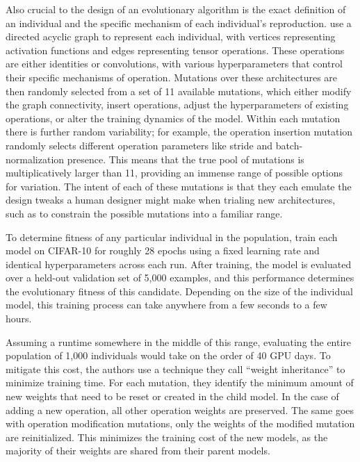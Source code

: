 Also crucial to the design of an evolutionary algorithm is the exact definition of an individual and the specific mechanism
of each individual's reproduction. \citeauthor{real2017} use a directed acyclic graph to represent each individual, with vertices
representing activation functions and edges representing tensor operations. These operations are either identities or
convolutions, with various hyperparameters that control their specific mechanisms of operation. Mutations over these
architectures are then randomly selected from a set of 11 available mutations, which either modify the graph connectivity,
insert operations, adjust the hyperparameters of existing operations, or alter the training dynamics of the model. Within
each mutation there is further random variability; for example, the operation insertion mutation randomly selects
different operation parameters like stride and batch-normalization presence. This means that the true pool of mutations
is multiplicatively larger than 11, providing an immense range of possible options for variation. The
intent of each of these mutations is that they each emulate the design tweaks a human designer might make when trialing
new architectures, such as to constrain the possible mutations into a familiar range.

To determine fitness of any particular individual in the population, \citeauthor{real2017} train each model on CIFAR-10 for
roughly 28 epochs using a fixed learning rate and identical hyperparameters across each run. After training, the model
is evaluated over a held-out validation set of 5,000 examples, and this performance determines the evolutionary fitness
of this candidate. Depending on the size of the individual model, this training process can take anywhere from a few
seconds to a few hours.

Assuming a runtime somewhere in the middle of this range, evaluating the entire population of 1,000 individuals would
take on the order of 40 GPU days. To mitigate this cost, the authors use a technique they call ``weight inheritance''
to minimize training time. For each mutation, they identify the minimum amount of new weights that need to be reset or
created in the child model. In the case of adding a new operation, all other operation weights are preserved. The
same goes with operation modification mutations, only the weights of the modified mutation are reinitialized. This
minimizes the training cost of the new models, as the majority of their weights are shared from their parent models.

